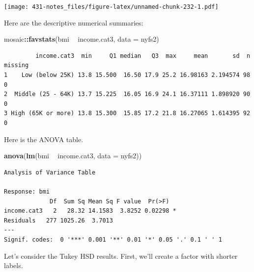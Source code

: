 \documentclass[
]{book}
\newenvironment{Shaded}{\begin{snugshade}}{\end{snugshade}}
\newcommand{\DataTypeTok}[1]{\textcolor[rgb]{0.13,0.29,0.53}{#1}}
\newcommand{\FloatTok}[1]{\textcolor[rgb]{0.00,0.00,0.81}{#1}}
\newcommand{\KeywordTok}[1]{\textcolor[rgb]{0.13,0.29,0.53}{\textbf{#1}}}
\newcommand{\NormalTok}[1]{#1}
\newcommand{\OperatorTok}[1]{\textcolor[rgb]{0.81,0.36,0.00}{\textbf{#1}}}
\newcommand{\StringTok}[1]{\textcolor[rgb]{0.31,0.60,0.02}{#1}}
\begin{document}
\texttt{[image: 431-notes\_files/figure-latex/unnamed-chunk-232-1.pdf]}

Here are the descriptive numerical summaries:

\begin{Shaded}
\begin{Highlighting}[]
\NormalTok{mosaic}\OperatorTok{::}\KeywordTok{favstats}\NormalTok{(bmi }\OperatorTok{~}\StringTok{ }\NormalTok{income.cat3, }\DataTypeTok{data =}\NormalTok{ nyfs2)}
\end{Highlighting}
\end{Shaded}

\begin{verbatim}
         income.cat3  min     Q1 median   Q3  max     mean       sd  n missing
1    Low (below 25K) 13.8 15.500  16.50 17.9 25.2 16.98163 2.194574 98       0
2  Middle (25 - 64K) 13.7 15.225  16.05 16.9 24.1 16.37111 1.898920 90       0
3 High (65K or more) 13.8 15.300  15.85 17.2 21.8 16.27065 1.614395 92       0
\end{verbatim}

Here is the ANOVA table.

\begin{Shaded}
\begin{Highlighting}[]
\KeywordTok{anova}\NormalTok{(}\KeywordTok{lm}\NormalTok{(bmi }\OperatorTok{~}\StringTok{ }\NormalTok{income.cat3, }\DataTypeTok{data =}\NormalTok{ nyfs2))}
\end{Highlighting}
\end{Shaded}

\begin{verbatim}
Analysis of Variance Table

Response: bmi
             Df  Sum Sq Mean Sq F value  Pr(>F)  
income.cat3   2   28.32 14.1583  3.8252 0.02298 *
Residuals   277 1025.26  3.7013                  
---
Signif. codes:  0 '***' 0.001 '**' 0.01 '*' 0.05 '.' 0.1 ' ' 1
\end{verbatim}

Let's consider the Tukey HSD results. First, we'll create a factor with shorter labels.

\begin{Shaded}
\end{Shaded}
\end{document}

